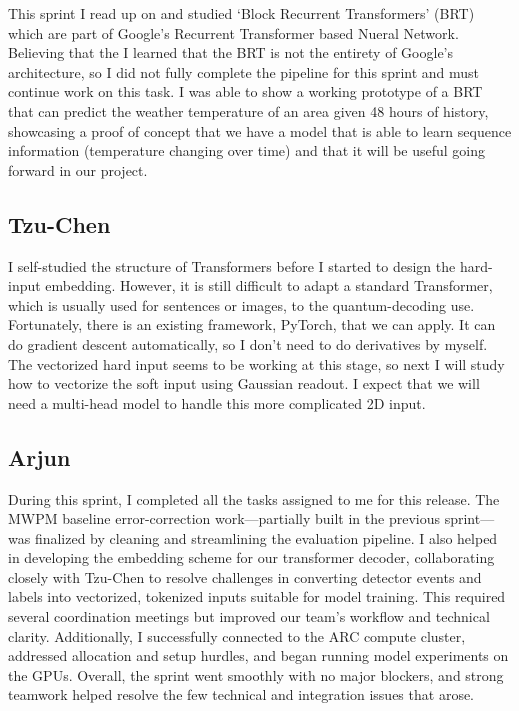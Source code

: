\documentclass[12pt]{article}
\begin{document}
This sprint I read up on and studied `Block Recurrent Transformers' (BRT) which are part of Google's Recurrent Transformer based Nueral Network. Believing that the 
I learned that the BRT is not the entirety of Google's architecture, so I did not fully complete the pipeline for this sprint and must continue work on this task.
I was able to show a working prototype of a BRT that can predict the weather temperature of an area given 48 hours of history, showcasing a proof of concept that 
we have a model that is able to learn sequence information (temperature changing over time) and that it will be useful going forward in our project.

\subsection*{Tzu-Chen}

I self-studied the structure of Transformers before I started to design the hard-input embedding. However, it is still difficult to adapt a standard Transformer, 
which is usually used for sentences or images, to the quantum-decoding use. Fortunately, there is an existing framework, PyTorch, that we can apply. It can do 
gradient descent automatically, so I don’t need to do derivatives by myself. The vectorized hard input seems to be working at this stage, so next I will study 
how to vectorize the soft input using Gaussian readout. I expect that we will need a multi-head model to handle this more complicated 2D input.

\subsection*{Arjun}

During this sprint, I completed all the tasks assigned to me for this release. The MWPM baseline error-correction work—partially built in the previous 
sprint—was finalized by cleaning and streamlining the evaluation pipeline. I also helped in developing the embedding scheme for our transformer decoder, 
collaborating closely with Tzu-Chen to resolve challenges in converting detector events and labels into vectorized, tokenized inputs suitable for model training. 
This required several coordination meetings but improved our team’s workflow and technical clarity. Additionally, I successfully connected to the ARC compute 
cluster, addressed allocation and setup hurdles, and began running model experiments on the GPUs. Overall, the sprint went smoothly with no major blockers, 
and strong teamwork helped resolve the few technical and integration issues that arose.
\end{document}
